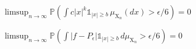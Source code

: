 \begin{lemma}
    \label{lem:fP_bound}
    \uses{}   %
    $\limsup_{n \to \infty}\mathbb{P}\left(\int c|x|^k\mathbb{1}_{|x|\ge b}\,\mu_{\mathrm{X}_n}(dx) > \epsilon/6\right) = 0 $
\end{lemma}


\begin{lemma}
    \label{lem:fP_zero}
    \notready
    $\limsup_{n \to \infty}  \mathbb{P}\left(\int |f-P_\epsilon| \mathbb{1}_{|x|\ge b}\,d\mu_{\mathrm{X}_n} > \epsilon/6\right) = 0$
\end{lemma}